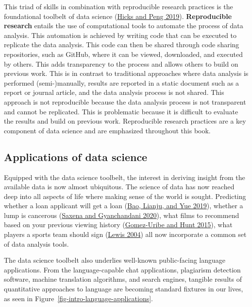 \documentclass[
  letterpaper,
  DIV=11,
  numbers=noendperiod]{scrreport}
\theoremstyle{definition}
\theoremstyle{remark}
\begin{document}
This triad of skills in combination with reproducible research practices
is the foundational toolbelt of data science
(\protect\hyperlink{ref-Hicks2019}{Hicks and Peng 2019}).
\textbf{Reproducible research} entails the
use of computational tools to automate the process of data analysis.
This automation is achieved by writing code that can be executed to
replicate the data analysis. This code can then be shared through code
sharing repositories, such as GitHub, where it can be viewed,
downloaded, and executed by others. This adds transparency to the
process and allows others to build on previous work. This is in contrast
to traditional approaches where data analysis is performed
(semi-)manually, results are reported in a static document such as a
report or journal article, and the data analysis process is not shared.
This approach is not reproducible because the data analysis process is
not transparent and cannot be replicated. This is problematic because it
is difficult to evaluate the results and build on previous work.
Reproducible research practices are a key component of data science and
are emphasized throughout this book.

\hypertarget{applications-of-data-science}{%
\subsection{Applications of data
science}\label{applications-of-data-science}}

Equipped with the data science toolbelt, the interest in deriving
insight from the available data is now almost ubiquitous. The science of
data has now reached deep into all aspects of life where making sense of
the world is sought. Predicting whether a loan applicant will get a loan
(\protect\hyperlink{ref-Bao2019}{Bao, Lianju, and Yue 2019}), whether a
lump is cancerous (\protect\hyperlink{ref-Saxena2020}{Saxena and
Gyanchandani 2020}), what films to recommend based on your previous
viewing history (\protect\hyperlink{ref-Gomez-Uribe2015}{Gomez-Uribe and
Hunt 2015}), what players a sports team should sign
(\protect\hyperlink{ref-Lewis2004}{Lewis 2004}) all now incorporate a
common set of data analysis tools.

The data science toolbelt also underlies well-known public-facing
language applications. From the language-capable chat applications,
plagiarism detection software, machine translation algorithms, and
search engines, tangible results of quantitative approaches to language
are becoming standard fixtures in our lives, as seen in
Figure~\ref{fig-intro-language-applications}.
\end{document}
